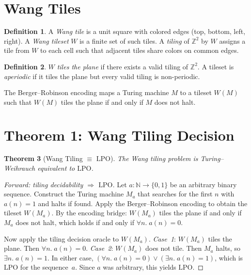 \documentclass[11pt,a4paper]{article}
\theoremstyle{plain}
\newtheorem{theorem}{Theorem}[section]
\theoremstyle{definition}
\newtheorem{definition}[theorem]{Definition}
\newcommand{\NN}{\mathbb{N}}
\newcommand{\ZZ}{\mathbb{Z}}
\newcommand{\LPO}{\ensuremath{\mathrm{LPO}}}
\begin{document}
\section{Wang Tiles}\label{sec:wang}

\begin{definition}
A \emph{Wang tile} is a unit square with colored edges
(top, bottom, left, right).
A \emph{Wang tileset} $W$ is a finite set of such tiles.
A \emph{tiling} of $\ZZ^2$ by $W$ assigns a tile from $W$ to
each cell such that adjacent tiles share colors on common edges.
\end{definition}

\begin{definition}
$W$ \emph{tiles the plane} if there exists a valid tiling of
$\ZZ^2$.  A tileset is \emph{aperiodic} if it tiles the plane
but every valid tiling is non-periodic.
\end{definition}

The Berger--Robinson encoding maps a Turing machine $M$ to a
tileset $W(M)$ such that $W(M)$ tiles the plane if and only if
$M$ does not halt.

\section{Theorem 1: Wang Tiling Decision}\label{sec:tiling}

\begin{theorem}[Wang Tiling $\equiv$ \LPO]\label{thm:tiling}
The Wang tiling problem is Turing--Weihrauch equivalent to \LPO.
\end{theorem}

\begin{proof}[Forward: tiling decidability $\Rightarrow$ \LPO]
Let $a : \NN \to \{0,1\}$ be an arbitrary binary sequence.
Construct the Turing machine $M_a$ that searches for the first
$n$ with $a(n) = 1$ and halts if found.  Apply the
Berger--Robinson encoding to obtain the tileset $W(M_a)$.
By the encoding bridge: $W(M_a)$ tiles the plane if and only if
$M_a$ does not halt, which holds if and only if
$\forall n.\; a(n) = 0$.

Now apply the tiling decision oracle to $W(M_a)$.
\emph{Case~1}: $W(M_a)$ tiles the plane.
Then $\forall n.\; a(n) = 0$.
\emph{Case~2}: $W(M_a)$ does not tile.
Then $M_a$ halts, so $\exists n.\; a(n) = 1$.
In either case, $(\forall n.\; a(n) = 0) \lor (\exists n.\; a(n) = 1)$,
which is \LPO{} for the sequence~$a$.
Since $a$ was arbitrary, this yields \LPO.
\end{proof}
\end{document}
